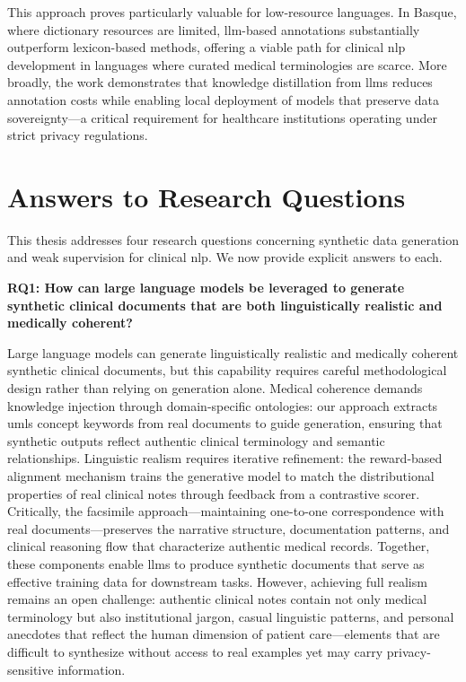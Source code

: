 This approach proves particularly valuable for low-resource languages.
In Basque, where dictionary resources are limited, \gls{llm}-based annotations substantially outperform lexicon-based methods, offering a viable path for clinical \gls{nlp} development in languages where curated medical terminologies are scarce.
More broadly, the work demonstrates that knowledge distillation from \glspl{llm} reduces annotation costs while enabling local deployment of models that preserve data sovereignty—a critical requirement for healthcare institutions operating under strict privacy regulations.

\section{Answers to Research Questions}

This thesis addresses four research questions concerning synthetic data generation and weak supervision for clinical \gls{nlp}.
We now provide explicit answers to each.

\textbf{RQ1: How can large language models be leveraged to generate synthetic clinical documents that are both linguistically realistic and medically coherent?}

Large language models can generate linguistically realistic and medically coherent synthetic clinical documents, but this capability requires careful methodological design rather than relying on generation alone.
Medical coherence demands knowledge injection through domain-specific ontologies: our approach extracts \gls{umls} concept keywords from real documents to guide generation, ensuring that synthetic outputs reflect authentic clinical terminology and semantic relationships.
Linguistic realism requires iterative refinement: the reward-based alignment mechanism trains the generative model to match the distributional properties of real clinical notes through feedback from a contrastive scorer.
Critically, the facsimile approach—maintaining one-to-one correspondence with real documents—preserves the narrative structure, documentation patterns, and clinical reasoning flow that characterize authentic medical records.
Together, these components enable \glspl{llm} to produce synthetic documents that serve as effective training data for downstream tasks.
However, achieving full realism remains an open challenge: authentic clinical notes contain not only medical terminology but also institutional jargon, casual linguistic patterns, and personal anecdotes that reflect the human dimension of patient care—elements that are difficult to synthesize without access to real examples yet may carry privacy-sensitive information.

